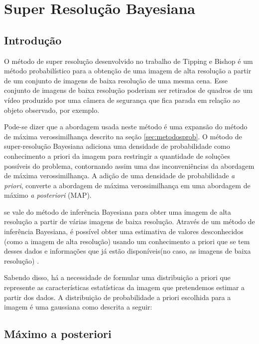 \chapter{Super Resolução Bayesiana}
\label{chap:srbayes}
\section{Introdução}
O método de super resolução desenvolvido no trabalho de Tipping e Bishop \cite{tipping2003bayesian} é um método probabilístico para a obtenção de uma imagem de alta resolução
a partir de um conjunto de imagens de baixa resolução de uma mesma cena.
Esse conjunto de imagens de baixa resolução poderiam ser retirados de quadros de um
vídeo produzido por uma câmera de segurança que fica parada em relação ao objeto
observado, por exemplo.

Pode-se dizer que a abordagem usada neste método é uma expansão do método de máxima
verossimilhança descrito na seção \ref{sec:metodosprob}.
O método de super-resolução Bayesiana adiciona uma densidade de probabilidade como
conhecimento a priori da imagem para restringir a quantidade de soluções possíveis do
problema, contornando assim uma das inconveniências da abordagem de máxima verossimilhança.
A adição de uma densidade de probabilidade \emph{a priori}, converte a abordagem de máxima verossimilhança em uma abordagem de máximo \emph{a posteriori} (MAP).

se vale do método de inferência Bayesiana para obter uma imagem de alta resolução a partir de várias imagens de baixa resolução.
Através de um método de inferência Bayesiana, é possível obter uma estimativa de valores desconhecidos (como a imagem de alta resolução) usando um conhecimento a priori que se tem desses dados e informações que já estão disponíveis(no caso, as imagens de baixa resolução) \cite{therrien2011probability}.

Sabendo disso, há a necessidade de formular uma distribuição a priori que represente as características estatísticas da imagem que pretendemos estimar a partir dos dados.
A distribuição de probabilidade a priori escolhida para a imagem é uma gaussiana como descrita a seguir:

\section{Máximo a posteriori}

